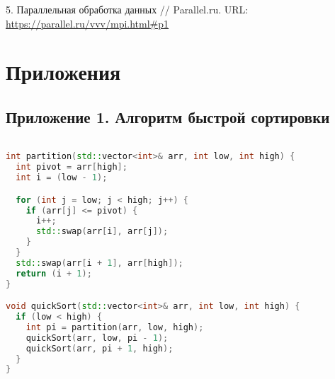 \documentclass{report}
\begin{document}
5. Параллельная обработка данных // Parallel.ru. URL: \url{https://parallel.ru/vvv/mpi.html#p1}

\newpage
\section*{Приложения}  

\subsection*{Приложение 1. Алгоритм быстрой сортировки}
\begin{lstlisting}[language=C++,caption={Приложение 1.}]

int partition(std::vector<int>& arr, int low, int high) {
  int pivot = arr[high];
  int i = (low - 1);

  for (int j = low; j < high; j++) {
    if (arr[j] <= pivot) {
      i++;
      std::swap(arr[i], arr[j]);
    }
  }
  std::swap(arr[i + 1], arr[high]);
  return (i + 1);
}

void quickSort(std::vector<int>& arr, int low, int high) {
  if (low < high) {
    int pi = partition(arr, low, high);
    quickSort(arr, low, pi - 1);
    quickSort(arr, pi + 1, high);
  }
}
\end{lstlisting}
\end{document}
